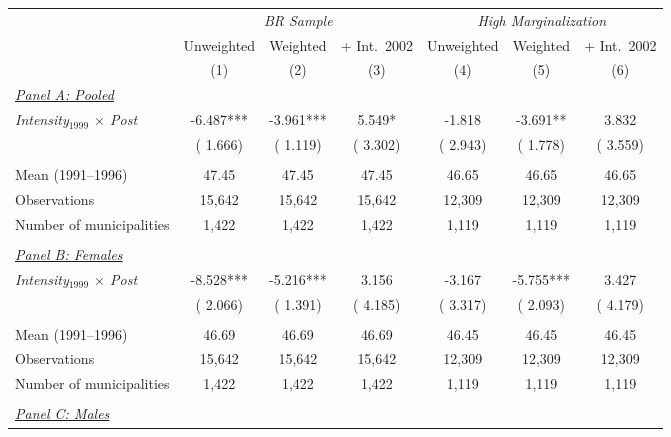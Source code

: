 \begin{tabular}{lcccccc} \hline \hline
& \multicolumn{3}{c}{\textit{BR Sample}} & \multicolumn{3}{c}{\textit{High Marginalization}} \\ \cmidrule(lr){2-4}\cmidrule(lr){5-7}
& \multicolumn{1}{c}{Unweighted} & \multicolumn{1}{c}{Weighted} & \multicolumn{1}{c}{+ Int.\ 2002} & \multicolumn{1}{c}{Unweighted} & \multicolumn{1}{c}{Weighted} & \multicolumn{1}{c}{+ Int.\ 2002} \\ 
\cmidrule(lr){2-2}\cmidrule(lr){3-3}\cmidrule(lr){4-4}\cmidrule(lr){5-5}\cmidrule(lr){6-6}\cmidrule(lr){7-7}
& \multicolumn{1}{c}{(1)} & \multicolumn{1}{c}{(2)} & \multicolumn{1}{c}{(3)} & \multicolumn{1}{c}{(4)} & \multicolumn{1}{c}{(5)} & \multicolumn{1}{c}{(6)} \\ \toprule
\underline{\textit{Panel A: Pooled}} \\ 
\textit{Intensity$_{1999}$ $\times$ Post}&    -6.487***&    -3.961***&     5.549*&    -1.818&    -3.691**&     3.832 \\ 
 & (    1.666)& (    1.119)& (    3.302)& (    2.943)& (    1.778)& (    3.559) \\ 
  & & & & & & \\ 
Mean (1991--1996)&     47.45&     47.45&     47.45&     46.65&     46.65&     46.65 \\ 
Observations&     15,642&     15,642&     15,642&     12,309&     12,309&     12,309 \\ 
Number of municipalities&      1,422&      1,422&      1,422&      1,119&      1,119&      1,119 \\ 
  & & & & & & \\ 
\underline{\textit{Panel B: Females}} \\ 
\textit{Intensity$_{1999}$ $\times$ Post}&    -8.528***&    -5.216***&     3.156&    -3.167&    -5.755***&     3.427 \\ 
 & (    2.066)& (    1.391)& (    4.185)& (    3.317)& (    2.093)& (    4.179) \\ 
  & & & & & & \\ 
Mean (1991--1996)&     46.69&     46.69&     46.69&     46.45&     46.45&     46.45 \\ 
Observations&     15,642&     15,642&     15,642&     12,309&     12,309&     12,309 \\ 
Number of municipalities&      1,422&      1,422&      1,422&      1,119&      1,119&      1,119 \\ 
  & & & & & & \\ 
\underline{\textit{Panel C: Males}} \\ 

\end{tabular}
